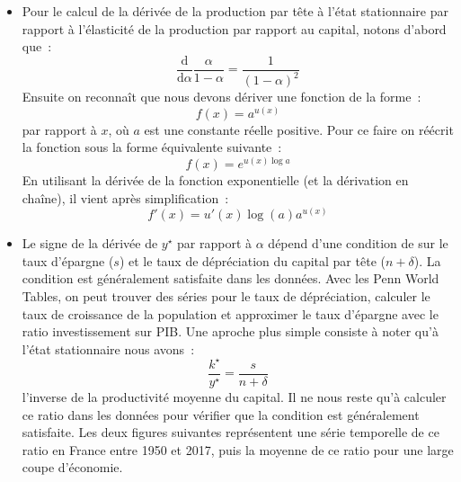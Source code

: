 \documentclass[10pt,notheorems]{beamer}
\theoremstyle{plain}
\theoremstyle{definition} %
\newenvironment{notes}
{\bgroup \justifying\bgroup\tiny\begin{spacing}{1.0}}
  {\end{spacing}\egroup\egroup}
\begin{document}
\begin{notes}
  \begin{itemize}

  \item Pour le calcul de la dérivée de la production par tête à l'état stationnaire par rapport à l'élasticité de la production par rapport au capital, notons d'abord que~:
    \[
      \frac{\mathrm d}{\mathrm d\alpha} \frac{\alpha}{1-\alpha} = \frac{1}{(1-\alpha)^2}
    \]
    Ensuite on reconnaît que nous devons dériver une fonction de la forme~:
    \[
      f(x) = a^{u(x)}
    \]
    par rapport à $x$, où $a$ est une constante réelle positive. Pour ce faire on réécrit la fonction sous la forme équivalente suivante~:
    \[
      f(x) = e^{u(x)\log a}
    \]
    En utilisant la dérivée de la fonction exponentielle (et la dérivation en chaîne), il vient après simplification~:
    \[
      f'(x)= u'(x)\log (a) a^{u(x)}
    \]

    \bigskip

  \item Le signe de la dérivée de $y^{\star}$ par rapport à $\alpha$
    dépend d'une condition de sur le taux d'épargne ($s$) et le taux
    de dépréciation du capital par tête ($n+\delta$). La condition est
    généralement satisfaite dans les données. Avec les Penn World
    Tables, on peut trouver des séries pour le taux de dépréciation,
    calculer le taux de croissance de la population et approximer le
    taux d'épargne avec le ratio investissement sur PIB. Une aproche
    plus simple consiste à noter qu'à l'état stationnaire nous
    avons~:
    \[
      \frac{k^{\star}}{y^{\star}} = \frac{s}{n+\delta}
    \]
    l'inverse de la productivité moyenne du capital. Il ne nous
    reste qu'à calculer ce ratio dans les données pour vérifier que
    la condition est généralement satisfaite. Les deux figures
    suivantes représentent une série temporelle de ce ratio en
    France entre 1950 et 2017, puis la moyenne de ce ratio pour une
    large coupe d'économie.
  \end{itemize}

  \begin{center}
    
  \end{center}

  \begin{center}
    
  \end{center}

\end{notes}
\end{document}
